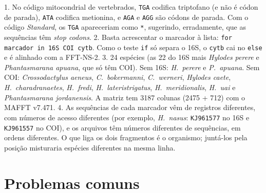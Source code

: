 \documentclass[11pt,a4paper]{article}
\newcommand{\ui}[1]{\textit{#1}}
\begin{document}
\begin{resposta}
1. No código mitocondrial de vertebrados, \texttt{TGA} codifica triptofano (e não é códon de
parada), \texttt{ATA} codifica metionina, e \texttt{AGA} e \texttt{AGG} são códons de parada.
Com o código \ui{Standard}, os \texttt{TGA} apareceriam como \texttt{*}, sugerindo,
erradamente, que as sequências têm \emph{stop codons}.
2. Basta acrescentar o marcador à lista: \verb|for marcador in 16S COI cytb|. Como o teste
\verb|if| só separa o 16S, o \verb|cytb| cai no \verb|else| e é alinhado com a FFT-NS-2.
3. 24 espécies (as 22 do 16S mais \emph{Hylodes perere} e \emph{Phantasmarana apuana}, que só
têm COI). Sem 16S: \emph{H.~perere} e \emph{P.~apuana}. Sem COI: \emph{Crossodactylus aeneus},
\emph{C.~bokermanni}, \emph{C.~werneri}, \emph{Hylodes caete}, \emph{H.~charadranaetes},
\emph{H.~fredi}, \emph{H.~lateristrigatus}, \emph{H.~meridionalis}, \emph{H.~uai} e
\emph{Phantasmarana jordanensis}. A matriz tem 3187 colunas (2475 + 712) com o MAFFT v7.471.
4. As sequências de cada marcador vêm de registros diferentes, com números de acesso
diferentes (por exemplo, \emph{H.~nasus}: \texttt{KJ961577} no 16S e \texttt{KJ961557} no
COI), e os arquivos têm números diferentes de sequências, em ordens diferentes. O que liga os
dois fragmentos é o organismo; juntá-los pela posição misturaria espécies diferentes na mesma
linha.
\end{resposta}

\clearpage
\appendix
\section{Problemas comuns}\label{ap:problemas}
\end{document}
